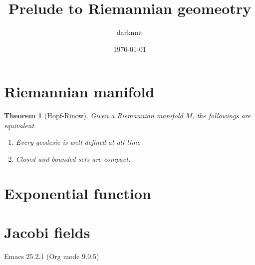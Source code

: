 \documentclass[11pt]{article}
\author{darknmt}
\date{\today}
\title{Prelude to Riemannian geomeotry}
\newtheorem{theorem}{Theorem}
\begin{document}
\maketitle
\tableofcontents


\section{Riemannian manifold}
\label{sec:org449782a}

\begin{theorem}[Hopf-Rinow]
\label{thm:hopf-rinow}
\label{org68a701f}
Given a Riemannian manifold \(M\), the followings are equivalent
\begin{enumerate}
\item Every geodesic is well-defined at all time
\item Closed and bounded sets are compact.
\end{enumerate}
\end{theorem}

\section{Exponential function}
\label{sec:org4d09cc7}


\section{Jacobi fields}
\label{sec:org14e4bde}
Emacs 25.2.1 (Org mode 9.0.5)
\end{document}
